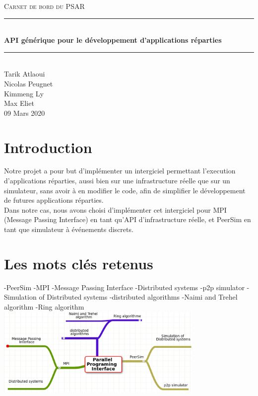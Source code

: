 \documentclass{article}
\date{\today}
\author{Tarik Atlaoui \\ Nicolas Peugnet \\ Kimmeng Ly \\ Max Eliet}
\begin{document}
\begin{titlepage}
	\enlargethispage{2cm}
	\newcommand{\HRule}{\rule{\linewidth}{0.5mm}}
	\center
	\textsc{\LARGE
	Carnet de bord du PSAR 
	} \\[1cm]
	\HRule \\[0.4cm]
	{ \huge \bfseries API générique pour le développement d'applications réparties \\[0.15cm] }
	\HRule \\[4cm]
	\large{Tarik Atlaoui \\[3mm] Nicolas Peugnet \\[3mm] Kimmeng Ly \\[3mm] Max Eliet} \\[3cm]
	09 Mars 2020 \\[3cm]
\end{titlepage}

	\newpage
		\section{Introduction}
			\large{
			\indent Notre projet a pour but d'implémenter un intergiciel permettant l'execution d'applications réparties, aussi bien sur une infrastructure réelle que sur un simulateur, sans avoir à en modifier le code, afin de simplifier le développement de futures applications réparties.
\\[2mm]
			 \indent Dans notre cas, nous avons choisi d'implémenter cet intergiciel pour MPI (Message Passing Interface) en tant qu'API d'infrastructure réelle, et PeerSim en tant que simulateur à événements discrets.}
		
		\section{Les mots clés retenus}
		-PeerSim
		\newline
		-MPI
		\newline
		-Message Passing Interface
		\newline
		-Distributed systems
		\newline
		-p2p simulator
		\newline
		-Simulation of Distributed systems
		\newline
		-distributed algorithms
		\newline
		-Naimi and Trehel algorithm
		\newline
		-Ring algorithm
		\newline 
		\includegraphics[width=10cm]{mindmap.png}
		\newpage		
\end{document}

